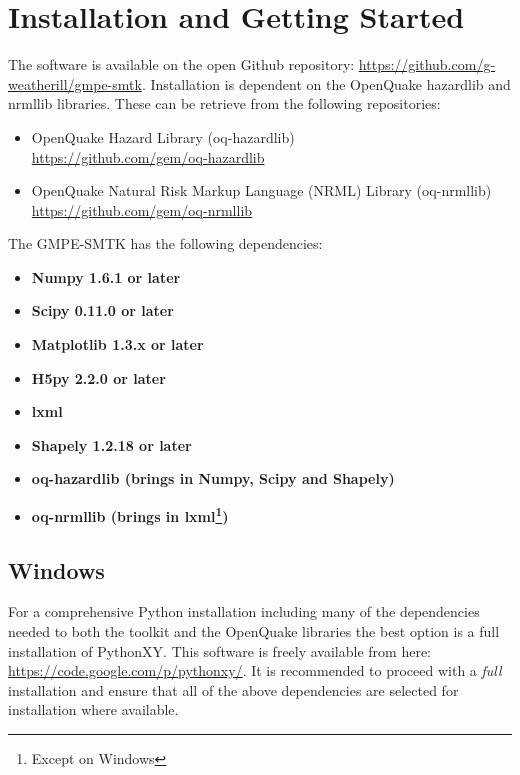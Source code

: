 \section{Installation and Getting Started}
\label{sec:installation}

The software is available on the open Github repository: \href{https://github.com/g-weatherill/gmpe-smtk}{https://github.com/g-weatherill/gmpe-smtk}. Installation is dependent on the OpenQuake hazardlib and nrmllib libraries. These can be retrieve from the following repositories:
\begin{itemize}
\item OpenQuake Hazard Library (oq-hazardlib)\\
\href{https://github.com/gem/oq-hazardlib}{https://github.com/gem/oq-hazardlib}
\item OpenQuake Natural Risk Markup Language (NRML) Library (oq-nrmllib)\\
\href{https://github.com/gem/oq-nrmllib}{https://github.com/gem/oq-nrmllib}
\end{itemize}

The GMPE-SMTK has the following dependencies:

\begin{itemize}
\item \textbf{Numpy 1.6.1 or later}
\item \textbf{Scipy 0.11.0 or later}
\item \textbf{Matplotlib 1.3.x or later}
\item \textbf{H5py 2.2.0 or later}
\item \textbf{lxml}
\item \textbf{Shapely 1.2.18 or later}
\item \textbf{oq-hazardlib (brings in Numpy, Scipy and Shapely)}
\item \textbf{oq-nrmllib (brings in lxml\footnote{Except on Windows})} 
\end{itemize}


\subsection{Windows}

For a comprehensive Python installation including many of the dependencies needed to both the toolkit and the OpenQuake libraries the best option is a full installation of PythonXY. This software is freely available from here: \href{https://code.google.com/p/pythonxy/}{https://code.google.com/p/pythonxy/}. It is recommended to proceed with a \emph{full} installation and ensure that all of the above dependencies are selected for installation where available.

